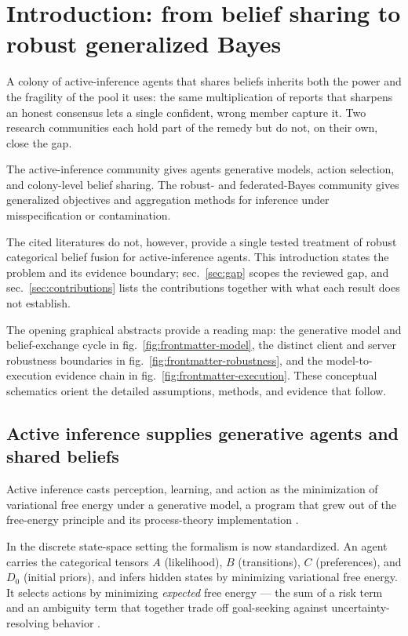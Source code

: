 \documentclass[
  english,
]{article}
\theoremstyle{plain}
\theoremstyle{definition}
\theoremstyle{remark}
\theoremstyle{definition}
\begin{document}
\section{Introduction: from belief sharing to robust generalized
Bayes}\label{sec:introduction}

A colony of active-inference agents that shares beliefs inherits both
the power and the fragility of the pool it uses: the same multiplication
of reports that sharpens an honest consensus lets a single confident,
wrong member capture it. Two research communities each hold part of the
remedy but do not, on their own, close the gap.

The active-inference community gives agents generative models, action
selection, and colony-level belief sharing. The robust- and
federated-Bayes community gives generalized objectives and aggregation
methods for inference under misspecification or contamination.

The cited literatures do not, however, provide a single tested treatment
of robust categorical belief fusion for active-inference agents. This
introduction states the problem and its evidence boundary;
sec.~\ref{sec:gap} scopes the reviewed gap, and
sec.~\ref{sec:contributions} lists the contributions together with what
each result does not establish.

The opening graphical abstracts provide a reading map: the generative
model and belief-exchange cycle in fig.~\ref{fig:frontmatter-model}, the
distinct client and server robustness boundaries in
fig.~\ref{fig:frontmatter-robustness}, and the model-to-execution
evidence chain in fig.~\ref{fig:frontmatter-execution}. These conceptual
schematics orient the detailed assumptions, methods, and evidence that
follow.

\subsection{Active inference supplies generative agents and shared
beliefs}\label{sec:intro-active-inference}

Active inference casts perception, learning, and action as the
minimization of variational free energy under a generative model, a
program that grew out of the free-energy principle
\citep{friston2010free} and its process-theory implementation
\citep{friston2017active}.

In the discrete state-space setting the formalism is now standardized.
An agent carries the categorical tensors \(A\) (likelihood), \(B\)
(transitions), \(C\) (preferences), and \(D_0\) (initial priors), and
infers hidden states by minimizing variational free energy. It selects
actions by minimizing \emph{expected} free energy --- the sum of a risk
term and an ambiguity term that together trade off goal-seeking against
uncertainty-resolving behavior \citep{dacosta2020active}.
\end{document}
